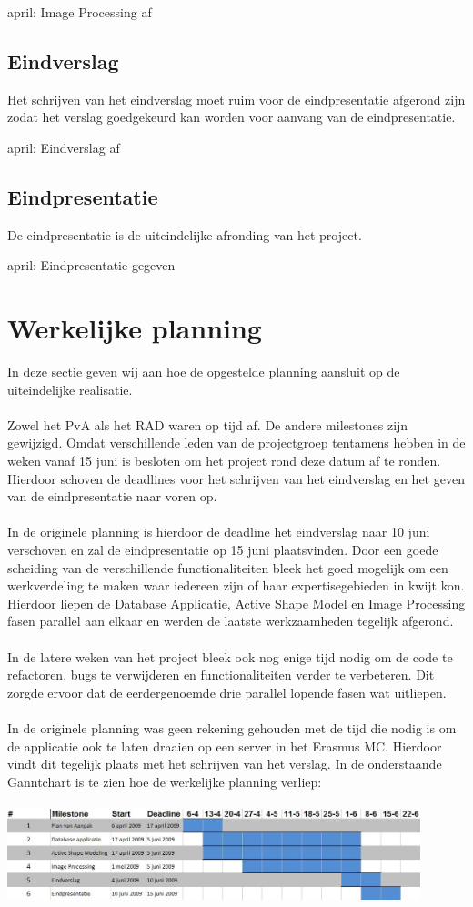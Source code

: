  april: Image Processing af

\subsection{Eindverslag}
Het schrijven van het eindverslag moet ruim voor de eindpresentatie afgerond
zijn zodat het verslag goedgekeurd kan worden voor aanvang van de eindpresentatie.

 april: Eindverslag af

\subsection{Eindpresentatie}
De eindpresentatie is de uiteindelijke afronding van het project.

 april: Eindpresentatie gegeven

\section{Werkelijke planning}
\label{werkelijke_planning}
In deze sectie geven wij aan hoe de opgestelde planning aansluit op de
uiteindelijke realisatie.
\\
\\
Zowel het PvA als het RAD waren op tijd af. De andere milestones zijn
gewijzigd. Omdat verschillende leden van de projectgroep tentamens
hebben in de weken vanaf 15 juni is besloten om het project rond deze datum af
te ronden. Hierdoor schoven de deadlines voor het schrijven van het eindverslag
en het geven van de eindpresentatie naar voren op.
\\
\\
In de originele planning is hierdoor de deadline het eindverslag naar 10 juni verschoven en zal de eindpresentatie op 15 juni plaatsvinden.
Door een goede scheiding van de verschillende functionaliteiten bleek het goed mogelijk om een werkverdeling te maken waar iedereen zijn of haar expertisegebieden in kwijt kon.
Hierdoor liepen de Database Applicatie, Active Shape Model en Image Processing fasen parallel aan elkaar en werden de laatste werkzaamheden tegelijk afgerond.
\\
\\
In de latere weken van het project bleek ook nog enige tijd nodig om de code te
refactoren, bugs te verwijderen en functionaliteiten verder te verbeteren. Dit
zorgde ervoor dat de eerdergenoemde drie parallel lopende fasen wat uitliepen.
\\
\\
In de originele planning was geen rekening gehouden met de tijd die nodig is om
de applicatie ook te laten draaien op een server in het Erasmus MC. Hierdoor
vindt dit tegelijk plaats met het schrijven van het verslag.
In de onderstaande Ganntchart is te zien hoe de werkelijke planning verliep:
\\
\\
\includegraphics[width=0.9\textwidth]{ganntafter}
